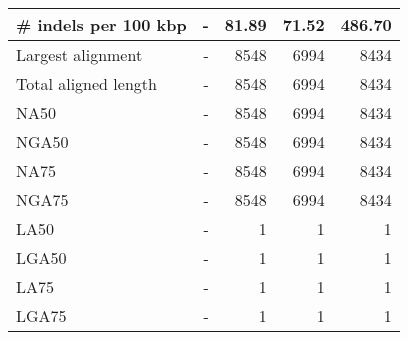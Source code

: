 \documentclass[12pt,a4paper]{article}
\begin{document}
\begin{table}[ht]
\begin{center}
\begin{tabular}{|l*{4}{|r}|}
\# indels per 100 kbp & - & 81.89 & 71.52 & 486.70 \\ \hline
Largest alignment & - & 8548 & 6994 & 8434 \\ \hline
Total aligned length & - & 8548 & 6994 & 8434 \\ \hline
NA50 & - & 8548 & 6994 & 8434 \\ \hline
NGA50 & - & 8548 & 6994 & 8434 \\ \hline
NA75 & - & 8548 & 6994 & 8434 \\ \hline
NGA75 & - & 8548 & 6994 & 8434 \\ \hline
LA50 & - & 1 & 1 & 1 \\ \hline
LGA50 & - & 1 & 1 & 1 \\ \hline
LA75 & - & 1 & 1 & 1 \\ \hline
LGA75 & - & 1 & 1 & 1 \\ \hline
\end{tabular}
\end{center}
\end{table}
\end{document}
